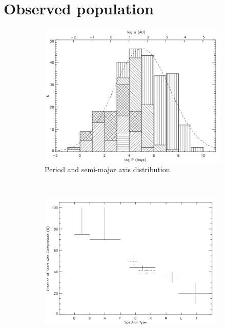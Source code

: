 \section{Observed population}
\label{Sec:0_raghavan}

\begin{figure}
\center
    \centering
    \begin{subfigure}[b]{0.48\textwidth}
    	\centering
        \includegraphics[width=\textwidth]{Figures/0_binperiods.png}
        \caption{Period and semi-major axis distribution}
        \label{Fig:0_binpop_1}
    \end{subfigure}
    ~~
    \begin{subfigure}[b]{0.48\textwidth}
    	\centering
        \includegraphics[width=0.97\textwidth]{Figures/0_binfraction.png}

\end{subfigure}
\end{figure}
